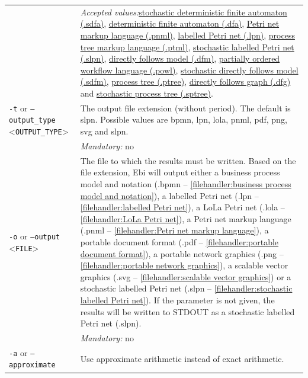 {\begin{tabularx}{\linewidth}{lX}
&\textit{Accepted values:}\quad \hyperref[filehandler:stochastic deterministic finite automaton]{stochastic deterministic finite automaton (.sdfa)}, \hyperref[filehandler:deterministic finite automaton]{deterministic finite automaton (.dfa)}, \hyperref[filehandler:Petri net markup language]{Petri net markup language (.pnml)}, \hyperref[filehandler:labelled Petri net]{labelled Petri net (.lpn)}, \hyperref[filehandler:process tree markup language]{process tree markup language (.ptml)}, \hyperref[filehandler:stochastic labelled Petri net]{stochastic labelled Petri net (.slpn)}, \hyperref[filehandler:directly follows model]{directly follows model (.dfm)}, \hyperref[filehandler:partially ordered workflow language]{partially ordered workflow language (.powl)}, \hyperref[filehandler:stochastic directly follows model]{stochastic directly follows model (.sdfm)}, \hyperref[filehandler:process tree]{process tree (.ptree)}, \hyperref[filehandler:directly follows graph]{directly follows graph (.dfg)} and \hyperref[filehandler:stochastic process tree]{stochastic process tree (.sptree)}.\\
\texttt{-t} or \texttt{--output\_type} <\texttt{OUTPUT\_TYPE}> &
The output file extension (without period). The default is slpn. Possible values are bpmn, lpn, lola, pnml, pdf, png, svg and slpn.\\
&\textit{Mandatory:} \quad no\\
\texttt{-o} or \texttt{--output} <\texttt{FILE}> &
The file to which the results must be written. Based on the file extension, Ebi will output either a business process model and notation (.bpmn -- \cref{filehandler:business process model and notation}), a labelled Petri net (.lpn -- \cref{filehandler:labelled Petri net}), a LoLa Petri net (.lola -- \cref{filehandler:LoLa Petri net}), a Petri net markup language (.pnml -- \cref{filehandler:Petri net markup language}), a portable document format (.pdf -- \cref{filehandler:portable document format}), a portable network graphics (.png -- \cref{filehandler:portable network graphics}), a scalable vector graphics (.svg -- \cref{filehandler:scalable vector graphics}) or a stochastic labelled Petri net (.slpn -- \cref{filehandler:stochastic labelled Petri net}).
If the parameter is not given, the results will be written to STDOUT as a stochastic labelled Petri net (.slpn).\\
&\textit{Mandatory:} \quad no\\
\texttt{-a} or \texttt{--approximate} & Use approximate arithmetic instead of exact arithmetic.\\

\end{tabularx}}
